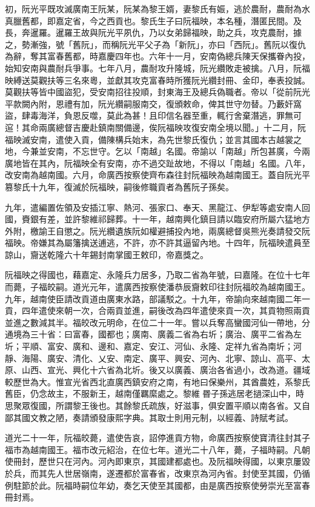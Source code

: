 \begin{pinyinscope}
初，阮光平既攻滅廣南王阮某，阮某為黎王婿，妻黎氏有娠，逃於農耐，農耐為水真臘舊都，即嘉定省，今之西貢也。黎氏生子曰阮福映，本名種，潛匿民間。及長，奔暹羅。暹羅王故與阮光平夙仇，乃以女弟歸福映，助之兵，攻克農耐，據之，勢漸強，號「舊阮」，而稱阮光平父子為「新阮」，亦曰「西阮」。舊阮以復仇為辭，奪其富春舊都，時嘉慶四年也。六年十一月，安南偽總兵陳天保攜眷內投，始知安南與農耐兵爭事。七年八月，農耐攻升隆城，阮光纘敗走被擒。八月，阮福映縛送莫觀扶等三名來粵，並獻其攻克富春時所獲阮光纘封冊、金印，奉表投誠。莫觀扶等皆中國盜犯，受安南招往投順，封東海王及總兵偽職者。帝以「從前阮光平款闕內附，恩禮有加，阮光纘嗣服南交，復頒敕命，俾其世守勿替。乃藪奸窩盜，肆毒海洋，負恩反噬，莫此為甚！且印信名器至重，輒行舍棄潛逃，罪無可逭！其命兩廣總督吉慶赴鎮南關備邊，俟阮福映攻復安南全境以聞。」十二月，阮福映滅安南，遣使入貢，備陳構兵始末，為先世黎氏復仇；並言其國本古越裳之地，今兼並安南，不忘世守。乞以「南越」名國。帝諭以「南越」所包甚廣，今兩廣地皆在其內，阮福映全有安南，亦不過交趾故地，不得以「南越」名國。八年，改安南為越南國。六月，命廣西按察使齊布森往封阮福映為越南國王。蓋自阮光平篡黎氏十九年，復滅於阮福映，嗣後修職貢者為舊阮子孫矣。

九年，遣編置佐領及安插江寧、熱河、張家口、奉天、黑龍江、伊犁等處安南人回國，賚銀有差，並許黎維祁歸葬。十一年，越南興化鎮目請以臨安府所屬六猛地方外附，檄諭王自懲之。阮光纘遺族阮如權避捕投內地，兩廣總督吳熊光奏請發交阮福映。帝嫌其為屬籓擒送逋逃，不許，亦不許其逼留內地。十四年，阮福映遣員至諒山，齎送乾隆六十年錫封南掌國王敕印，帝嘉獎之。

阮福映之得國也，藉嘉定、永隆兵力居多，乃取二省為年號，曰嘉隆。在位十七年而薨，子福皎嗣。道光元年，遣廣西按察使潘恭辰齎敕印往封阮福皎為越南國王。九年，越南使臣請改貢道由廣東水路，部議駁之。十九年，帝諭向來越南國二年一貢，四年遣使來朝一次，合兩貢並進，嗣後改為四年遣使來貢一次，其貢物照兩貢並進之數減其半。福皎改元明命，在位二十一年。嘗以兵奪高蠻國河仙一帶地，分通境為三十省：曰富春，國都也；廣南、廣義二省為右圻；廣治、廣平二省為左圻；平順、富安、廣和、邊和、嘉定、安江、河仙、永隆、定祥九省為南圻；河靜、海陽、廣安、清化、乂安、南定、廣平、興安、河內、北寧、諒山、高平、太原、山西、宣光、興化十六省為北圻。後又以廣義、廣治各省過小，改為道。疆域較歷世為大。惟宣光省西北直廣西鎮安府之南，有地曰保樂州，其酋農姓，系黎氏舊臣，仍念故主，不服新王，越南僅羈縻處之。黎維昬子孫逃居老撾深山中，時思聚眾復國，所謂黎王後也。其餘黎氏疏族，好滋事，俱安置平順以南各省。又自鄙其國文教之陋，奏請頒發康熙字典。其取士則用元制，以經義、詩賦考試。

道光二十一年，阮福皎薨，遣使告哀，詔停進貢方物，命廣西按察使寶清往封其子福巿為越南國王。福巿改元紹治，在位七年。道光二十八年，薨，子福時嗣。凡朝使冊封，歷世只在河內。河內即東京，其國建都處也。及阮福映得國，以東京屢毀於兵，而其先人世居嶺南，遂遷都於富春省，改東京為河內省。封使至其國，仍循例駐節於此。阮福時嗣位年幼，奏乞天使至其國都，由是廣西按察使勞崇光至富春冊封焉。


\end{pinyinscope}
